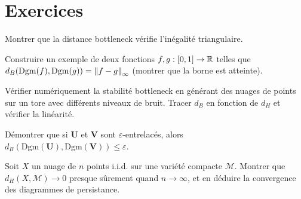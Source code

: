 \section{Exercices}

\begin{exercice}
Montrer que la distance bottleneck v\'erifie l'in\'egalit\'e
triangulaire.
\end{exercice}

\begin{exercice}
Construire un exemple de deux fonctions $f, g : [0, 1] \to \mathbb{R}$ telles
que $d_B(\mathrm{Dgm}(f), \mathrm{Dgm}(g)) = \left\| f - g \right\|_\infty$
(montrer que la borne est atteinte).
\end{exercice}

\begin{exercice}
V\'erifier num\'eriquement la stabilit\'e bottleneck en g\'en\'erant
des nuages de points sur un tore avec diff\'erents niveaux de bruit.
Tracer $d_B$ en fonction de $d_H$ et v\'erifier la lin\'earit\'e.
\end{exercice}

\begin{exercice}
D\'emontrer que si $\mathbf{U}$ et $\mathbf{V}$ sont
$\varepsilon$-entrelac\'es, alors
$d_B(\mathrm{Dgm}(\mathbf{U}), \mathrm{Dgm}(\mathbf{V})) \leq \varepsilon$.
\end{exercice}

\begin{exercice}
Soit $X$ un nuage de $n$ points i.i.d. sur une vari\'et\'e compacte
$\mathcal{M}$. Montrer que $d_H(X, \mathcal{M}) \to 0$ presque
s\^urement quand $n \to \infty$, et en d\'eduire la convergence des
diagrammes de persistance.
\end{exercice}
